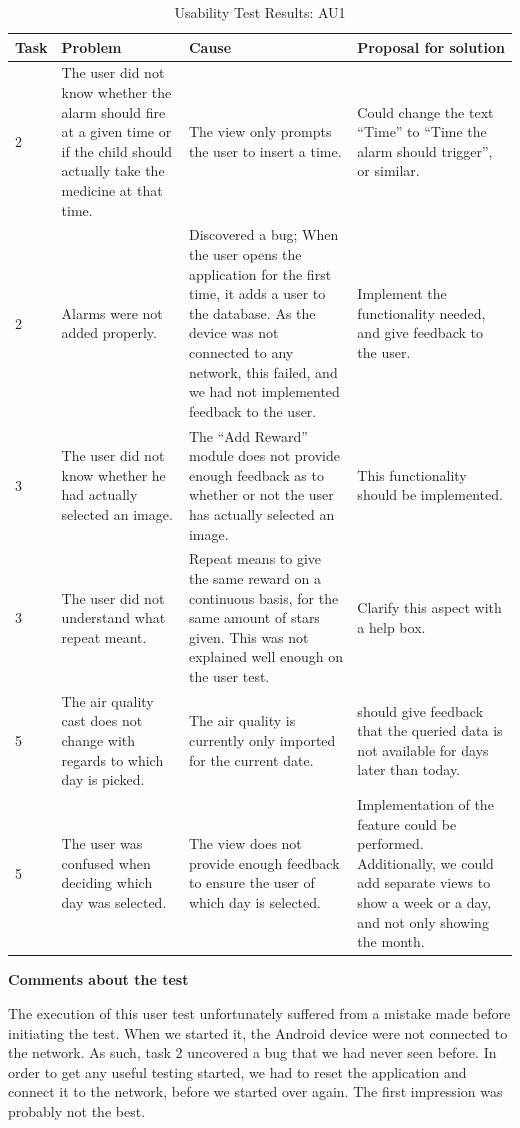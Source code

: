 \begin{table}[H]
\centering
\begin{tabular}{| p{0.8cm} | p{3.0cm} | p{5.0cm} | p{4.2cm} |}
\hline
	\textbf{Task} & \textbf{Problem} & \textbf{Cause} & \textbf{Proposal for solution} \\
	\hline
	2 & The user did not know whether the alarm should fire at a given time or if the child should actually take the medicine at that time. & The view only prompts the user to insert a time. & Could change the text ``Time'' to ``Time the alarm should trigger'', or similar. \\
	\hline
	2 & Alarms were not added properly. & Discovered a bug; When the user opens the application for the first time, it adds a user to the database. As the device was not connected to any network, this failed, and we had not implemented feedback to the user. & Implement the functionality needed, and give feedback to the user. \\
	\hline
	3 & The user did not know whether he had actually selected an image. & The ``Add Reward'' module does not provide enough feedback as to whether or not the user has actually selected an image. & This functionality should be implemented.  \\
	\hline
	3 & The user did not understand what repeat meant. & Repeat means to give the same reward on a continuous basis, for the same amount of stars given. This was not explained well enough on the user test. & Clarify this aspect with a help box.   \\
	\hline
	5 & The air quality cast does not change with regards to which day is picked. & The air quality is currently only imported for the current date. & \app{} should give feedback that the queried data is not available for days later than today. \\ 
	\hline
	5 & The user was confused when deciding which day was selected. & The view does not provide enough feedback to ensure the user of which day is selected. & Implementation of the feature could be performed. Additionally, we could add separate views to show a week or a day, and not only showing the month. \\
	\hline  
\end{tabular}
\caption{Usability Test Results: AU1}
\label{tab:testadult2}
\end{table}



\textbf{Comments about the test}

The execution of this user test unfortunately suffered from a mistake made before initiating the test. When we started it, the Android device were not connected to the network. As such, task 2 uncovered a bug that we had never seen before. In order to get any useful testing started, we had to reset the application and connect it to the network, before we started over again. The first impression was probably not the best.   


